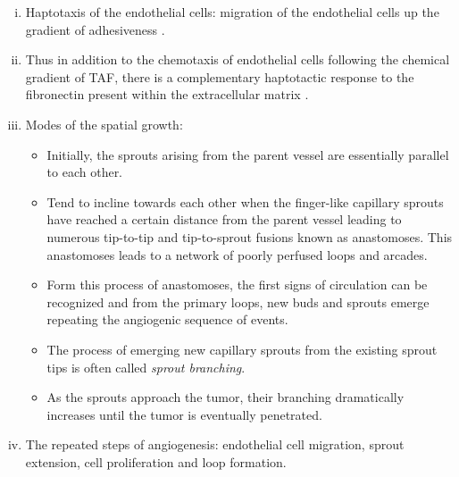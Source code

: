 \begin{enumerate}[(i),noitemsep]
\begin{itemize}
	\end{itemize}
	\item Haptotaxis of the endothelial cells: migration of the endothelial cells up the gradient of adhesiveness \cite{Everitt1996,McCarthy1984,Carter1965}.
	\item Thus in addition to the chemotaxis of endothelial cells following the chemical gradient of TAF, there is a complementary haptotactic response to the fibronectin present within the extracellular matrix \cite{Bowersox1982}.
	\item Modes of the spatial growth:
	\begin{itemize}
		\item Initially, the sprouts arising from the parent vessel are essentially parallel to each other. 
		\item Tend to incline towards each other when the finger-like capillary sprouts have reached a certain distance from the parent vessel \cite{Paweletz1989} leading to numerous tip-to-tip and tip-to-sprout fusions known as anastomoses. This anastomoses leads to a network of poorly perfused loops and arcades.
		\item Form this process of anastomoses, the first signs of circulation can be recognized and from the primary loops, new buds and sprouts emerge repeating the angiogenic sequence of events.
		\item The process of emerging new capillary sprouts from the existing sprout tips is often called \emph{sprout branching}.
		\item As the sprouts approach the tumor, their branching dramatically increases until the tumor is eventually penetrated.
	\end{itemize}
	\item The repeated steps of angiogenesis: endothelial cell migration, sprout extension, cell proliferation and loop formation.
\end{enumerate}


